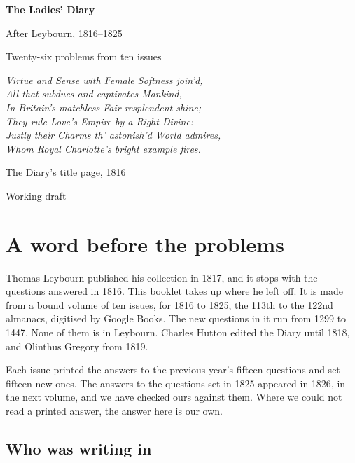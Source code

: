 \documentclass[11pt,a4paper]{article}
\newcounter{prob}
\begin{document}
\begin{titlepage}
\centering
\vspace*{3cm}
{\Huge\bfseries The Ladies' Diary\par}
\vspace{0.4cm}
{\LARGE After Leybourn, 1816--1825\par}
\vspace{0.8cm}
{\Large Twenty-six problems from ten issues\par}
\vspace{2cm}
{\large\itshape Virtue and Sense with Female Softness join'd,\\
All that subdues and captivates Mankind,\\
In Britain's matchless Fair resplendent shine;\\
They rule Love's Empire by a Right Divine:\\
Justly their Charms th' astonish'd World admires,\\
Whom Royal Charlotte's bright example fires.\par}
\vspace{0.3cm}
{\small The Diary's title page, 1816\par}
\vfill
{\large Working draft\par}
\end{titlepage}

\section*{A word before the problems}

Thomas Leybourn published his collection in 1817, and it stops with the questions answered
in 1816. This booklet takes up where he left off. It is made from a bound volume of ten
issues, for 1816 to 1825, the 113th to the 122nd almanacs, digitised by Google Books. The
new questions in it run from 1299 to 1447. None of them is in Leybourn. Charles Hutton
edited the Diary until 1818, and Olinthus Gregory from 1819.

Each issue printed the answers to the previous year's fifteen questions and set fifteen
new ones. The answers to the questions set in 1825 appeared in 1826, in the next volume, and we
have checked ours against them. Where we could not read a printed answer, the answer
here is our own.

\subsection*{Who was writing in}
\end{document}

